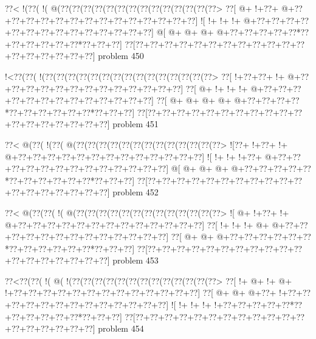 \vbox{\vbox{\goo
\0??<\- !(\0??(\- !(\- @(\0??(\0??(\0??(\0??(\0??(\0??(\0??(\0??(\0??(\0??(\0??(\0??(\0??(\0??>
\0??[\- @+\- !+\0??+\- @+\0??+\0??+\0??+\0??+\0??+\0??+\0??+\0??+\0??+\0??+\0??+\0??+\0??+\0??]
\- ![\- !+\- !+\- !+\- @+\0??+\0??+\0??+\0??+\0??+\0??+\0??+\0??+\0??+\0??+\0??+\0??+\0??+\0??]
\- @[\- @+\- @+\- @+\- @+\0??+\0??+\0??+\0??+\0??*\0??+\0??+\0??+\0??+\0??+\0??*\0??+\0??+\0??]
\0??[\0??+\0??+\0??+\0??+\0??+\0??+\0??+\0??+\0??+\0??+\0??+\0??+\0??+\0??+\0??+\0??+\0??+\0??]
}
\hfil problem 450\hfil\break
}



\vbox{\vbox{\goo
\- !<\0??(\0??(\- !(\0??(\0??(\0??(\0??(\0??(\0??(\0??(\0??(\0??(\0??(\0??(\0??(\0??(\0??(\0??>
\0??[\- !+\0??+\0??+\- !+\- @+\0??+\0??+\0??+\0??+\0??+\0??+\0??+\0??+\0??+\0??+\0??+\0??+\0??]
\0??[\- @+\- !+\- !+\- !+\- @+\0??+\0??+\0??+\0??+\0??+\0??+\0??+\0??+\0??+\0??+\0??+\0??+\0??]
\0??[\- @+\- @+\- @+\- @+\- @+\0??+\0??+\0??+\0??*\0??+\0??+\0??+\0??+\0??+\0??*\0??+\0??+\0??]
\0??[\0??+\0??+\0??+\0??+\0??+\0??+\0??+\0??+\0??+\0??+\0??+\0??+\0??+\0??+\0??+\0??+\0??+\0??]
}
\hfil problem 451\hfil\break
}



\vbox{\vbox{\goo
\0??<\- @(\0??(\- !(\0??(\- @(\0??(\0??(\0??(\0??(\0??(\0??(\0??(\0??(\0??(\0??(\0??(\0??(\0??>
\- ![\0??+\- !+\0??+\- !+\- @+\0??+\0??+\0??+\0??+\0??+\0??+\0??+\0??+\0??+\0??+\0??+\0??+\0??]
\- ![\- !+\- !+\- !+\0??+\- @+\0??+\0??+\0??+\0??+\0??+\0??+\0??+\0??+\0??+\0??+\0??+\0??+\0??]
\- @[\- @+\- @+\- @+\- @+\0??+\0??+\0??+\0??+\0??*\0??+\0??+\0??+\0??+\0??+\0??*\0??+\0??+\0??]
\0??[\0??+\0??+\0??+\0??+\0??+\0??+\0??+\0??+\0??+\0??+\0??+\0??+\0??+\0??+\0??+\0??+\0??+\0??]
}
\hfil problem 452\hfil\break
}



\vbox{\vbox{\goo
\0??<\- @(\0??(\0??(\- !(\- @(\0??(\0??(\0??(\0??(\0??(\0??(\0??(\0??(\0??(\0??(\0??(\0??(\0??>
\- ![\- @+\- !+\0??+\- !+\- @+\0??+\0??+\0??+\0??+\0??+\0??+\0??+\0??+\0??+\0??+\0??+\0??+\0??]
\0??[\- !+\- !+\- !+\- @+\- @+\0??+\0??+\0??+\0??+\0??+\0??+\0??+\0??+\0??+\0??+\0??+\0??+\0??]
\0??[\- @+\- @+\- @+\0??+\0??+\0??+\0??+\0??+\0??*\0??+\0??+\0??+\0??+\0??+\0??*\0??+\0??+\0??]
\0??[\0??+\0??+\0??+\0??+\0??+\0??+\0??+\0??+\0??+\0??+\0??+\0??+\0??+\0??+\0??+\0??+\0??+\0??]
}
\hfil problem 453\hfil\break
}



\vbox{\vbox{\goo
\0??<\0??(\0??(\- !(\- @(\- !(\0??(\0??(\0??(\0??(\0??(\0??(\0??(\0??(\0??(\0??(\0??(\0??(\0??>
\0??[\- !+\- @+\- !+\- @+\- !+\0??+\0??+\0??+\0??+\0??+\0??+\0??+\0??+\0??+\0??+\0??+\0??+\0??]
\0??[\- @+\- @+\- @+\0??+\- !+\0??+\0??+\0??+\0??+\0??+\0??+\0??+\0??+\0??+\0??+\0??+\0??+\0??]
\- ![\- !+\- !+\- !+\- !+\0??+\0??+\0??+\0??+\0??*\0??+\0??+\0??+\0??+\0??+\0??*\0??+\0??+\0??]
\0??[\0??+\0??+\0??+\0??+\0??+\0??+\0??+\0??+\0??+\0??+\0??+\0??+\0??+\0??+\0??+\0??+\0??+\0??]
}
\hfil problem 454\hfil\break
}



